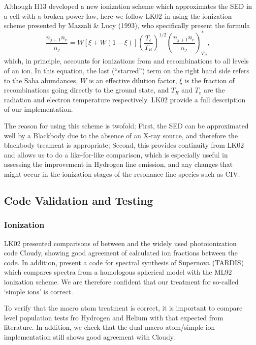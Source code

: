 \documentclass[useAMS,usenatbib, onecolumn]{mn2ejm}
\begin{document}
Although H13 developed a new ionization scheme which approximates the 
SED in a cell with a broken power law, here we follow LK02 in using the
ionization scheme presented by Mazzali \& Lucy (1993), who specifically
present the formula 
\begin{equation}
\frac{n_{j+1} n_e}{n_j} = W [\xi + W(1-\xi)]
\left(\frac{T_e}{T_R}\right)^{1/2}
\left(\frac{n_{j+1}n_e}{n_j}\right)^*_{T_R}, \label{ionization}
\end{equation}
which, in principle, accounts for ionizations from and
recombinations to all levels of an ion. In this equation, the last
(``starred'') term on the right hand side refers to the Saha
abundances, $W$ is an effective dilution factor, $\xi$ is the
fraction of recombinations going directly to the ground state, and
$T_R$ and $T_e$ are the radiation and electron temperature
respectively. LK02 provide a full description of our implementation.

The reason for using this scheme 
is twofold; First, the SED can be approximated well by a Blackbody due to the 
absence of an X-ray source, and therefore the blackbody treament is appropriate; 
Second, this provides continuity from LK02 and allows us to do a like-for-like comparison,
which is especially useful in assessing the improvement in Hydrogen line emission, and any changes
that might occur in the ionization stages of the resonance line species such as CIV. 


\subsection{Code Validation and Testing}
\subsubsection{Ionization}

LK02 presented comparisons of between \py and the widely used photoionization code Cloudy, showing good agreement 
of calculated ion fractions between the code. In addition, \cite{tardis} present a code for 
spectral synthesis of Supernova (\textsc{TARDIS}) which compares spectra from a homologous spherical model with
the ML92 ionization scheme. We are therefore confident that our treatment for so-called `simple ions' is correct.

To verify that the macro atom treatment is correct, it is important to compare level population tests 
fro Hydrogen and Helium with that expected from literature. In addition, we check that the dual macro atom/simple ion
implementation still shows good agreement with Cloudy.
\end{document}
